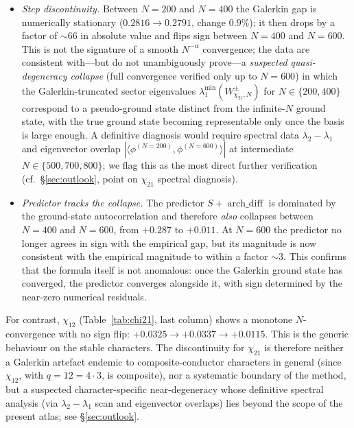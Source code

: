 \documentclass[10pt,twocolumn]{article}
\theoremstyle{definition}
\theoremstyle{remark}
\newcommand{\chifn}{\chi}
\newcommand{\archdiff}{\operatorname{arch\_diff}}
\begin{document}
\begin{itemize}
  \item[(i)] \emph{Step discontinuity.} Between $N=200$ and $N=400$
    the Galerkin gap is numerically stationary
    ($0.2816\to 0.2791$, change $0.9\%$); it then drops by a factor
    of $\sim 66$ in absolute value and flips sign between $N=400$
    and $N=600$. This is not the signature of a smooth
    $N^{-\alpha}$ convergence; the data are consistent with---but
    do not unambiguously prove---a \emph{suspected quasi-degeneracy
    collapse} (full convergence verified only up to $N=600$) in
    which the Galerkin-truncated sector eigenvalues
    $\lambda_1^{\min}(W^\pm_{\chifn_{21},N})$ for $N\in\{200,400\}$
    correspond to a pseudo-ground state distinct from the
    infinite-$N$ ground state, with the true ground state becoming
    representable only once the basis is large enough. A definitive
    diagnosis would require spectral data
    $\lambda_2-\lambda_1$ and eigenvector overlap
    $|\langle\phi^{(N=200)},\phi^{(N=600)}\rangle|$ at intermediate
    $N\in\{500,700,800\}$; we flag this as the most direct further
    verification (cf.\ \S\ref{sec:outlook}, point on $\chifn_{21}$
    spectral diagnosis).
  \item[(ii)] \emph{Predictor tracks the collapse.} The predictor
    $S+\archdiff$ is dominated by the ground-state autocorrelation
    and therefore \emph{also} collapses between $N=400$ and $N=600$,
    from $+0.287$ to $+0.011$. At $N=600$ the predictor no longer
    agrees in sign with the empirical gap, but its magnitude is now
    consistent with the empirical magnitude to within a factor
    $\sim 3$. This confirms that the formula itself is not
    anomalous: once the Galerkin ground state has converged, the
    predictor converges alongside it, with sign determined by the
    near-zero numerical residuals.
\end{itemize}

For contrast, $\chifn_{12}$ (Table~\ref{tab:chi21}, last column)
shows a monotone $N$-convergence with no sign flip:
$+0.0325\to+0.0337\to+0.0115$. This is the generic behaviour on the
stable characters. The discontinuity for $\chifn_{21}$ is therefore
neither a Galerkin artefact endemic to composite-conductor
characters in general (since $\chifn_{12}$, with $q=12=4\cdot 3$,
is composite), nor a systematic boundary of the method, but a
suspected character-specific near-degeneracy whose definitive
spectral analysis (via $\lambda_2-\lambda_1$ scan and eigenvector
overlaps) lies beyond the scope of the present atlas; see
\S\ref{sec:outlook}.
\end{document}

